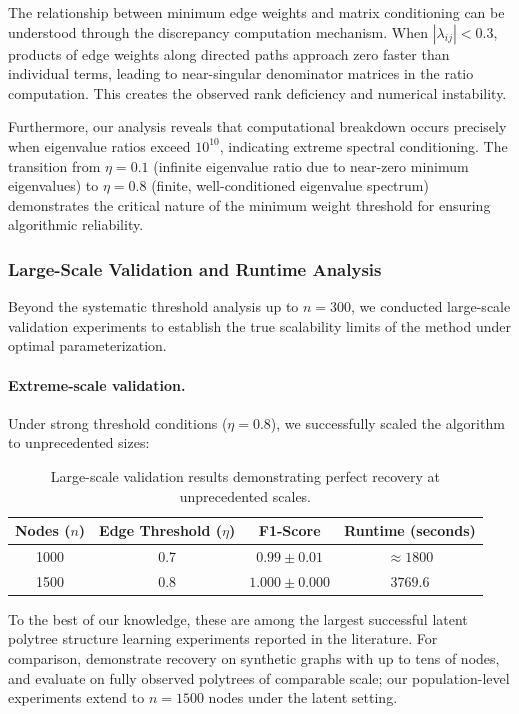 \documentclass[11pt,a4paper]{article}
\numberwithin{equation}{section}
\begin{document}
The relationship between minimum edge weights and matrix conditioning can be understood through the discrepancy computation mechanism. When $|\lambda_{ij}| < 0.3$, products of edge weights along directed paths approach zero faster than individual terms, leading to near-singular denominator matrices in the ratio computation. This creates the observed rank deficiency and numerical instability.

Furthermore, our analysis reveals that computational breakdown occurs precisely when eigenvalue ratios exceed $10^{10}$, indicating extreme spectral conditioning. The transition from $\eta = 0.1$ (infinite eigenvalue ratio due to near-zero minimum eigenvalues) to $\eta = 0.8$ (finite, well-conditioned eigenvalue spectrum) demonstrates the critical nature of the minimum weight threshold for ensuring algorithmic reliability.

\subsubsection{Large-Scale Validation and Runtime Analysis}

Beyond the systematic threshold analysis up to $n = 300$, we conducted large-scale validation experiments to establish the true scalability limits of the method under optimal parameterization.

\paragraph{Extreme-scale validation.} Under strong threshold conditions ($\eta = 0.8$), we successfully scaled the algorithm to unprecedented sizes:

\begin{table}[h]
\centering
\begin{tabular}{cccc}
\toprule
Nodes ($n$) & Edge Threshold ($\eta$) & F1-Score & Runtime (seconds) \\
\midrule
1000 & 0.7 & $0.99 \pm 0.01$ & $\approx 1800$ \\
1500 & 0.8 & $1.000 \pm 0.000$ & $3769.6$ \\
\bottomrule
\end{tabular}
\caption{Large-scale validation results demonstrating perfect recovery at unprecedented scales.}
\label{tab:large_scale}
\end{table}

To the best of our knowledge, these are among the largest successful
latent polytree structure learning experiments reported in the literature.
For comparison, \citet{etesami:kiyavash:coleman:2016} demonstrate recovery
on synthetic graphs with up to tens of nodes, and \citet{tramontano:monod:drton:2022}
evaluate on fully observed polytrees of comparable scale; our population-level
experiments extend to $n=1500$ nodes under the latent setting.
\end{document}
